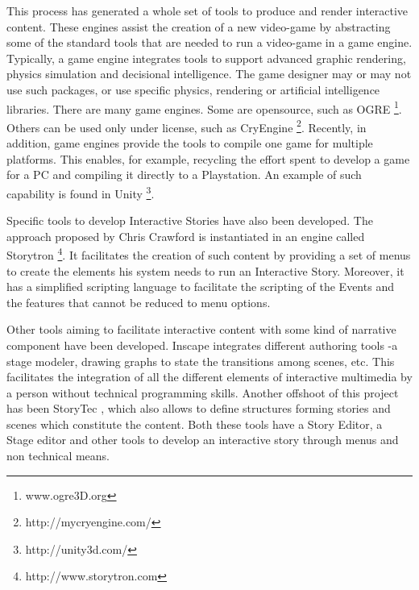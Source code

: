 \documentclass[
		twoside,openright,titlepage,numbers=noenddot,manychapters,
		headinclude,%
                footinclude=false,cleardoublepage=empty,
                BCOR=5mm,
		fontsize=11pt, %
                 enabledeprecatedfontcommands]{scrreprt}
\begin{document}
This process has generated a whole set of tools to produce and render interactive content. These engines assist the creation of a new video-game by abstracting some of the standard tools that are needed to run a video-game in a game engine. Typically, a game engine integrates tools to support advanced graphic rendering, physics simulation and decisional intelligence. The game designer may or may not use such packages, or use specific physics, rendering or artificial intelligence libraries. There are many game engines. Some are opensource, such as OGRE \footnote{www.ogre3D.org}. Others can be used only under license, such as CryEngine \footnote{http://mycryengine.com/}. Recently, in addition, game engines provide the tools to compile one game for multiple platforms. This enables, for example, recycling the effort spent to develop a game for a PC and compiling it directly to a Playstation. An example of such capability is found in Unity \footnote{http://unity3d.com/}.

Specific tools to develop Interactive Stories have also been developed. The approach proposed by Chris Crawford is instantiated in an engine called  Storytron \footnote{http://www.storytron.com}. It facilitates the creation of such content by providing a set of menus to create the elements his system needs to run an Interactive Story. Moreover, it has a simplified scripting language to facilitate the scripting of the Events and the features that cannot be reduced to menu options. 

Other tools aiming to facilitate interactive content with some kind of narrative component have been developed. Inscape \cite[]{balet2007inscape} integrates different authoring tools -a stage modeler, drawing graphs to state the transitions among scenes, etc. This facilitates the integration of all the different elements of interactive multimedia  by a person without technical programming skills. Another offshoot of this project has been  StoryTec \cite[]{gobel2008storytec}, which also allows to define structures forming stories and scenes which constitute the content. Both these tools have a Story Editor, a Stage editor and other tools to develop an interactive story through menus and non technical means.




\end{document}
